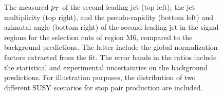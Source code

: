 \begin{figure}[!ht]
\begin{center}
{    }
  \end{center}
  \caption[Kinematic distributions of the $\pt$ of the second leading jet, the jet multiplicity, and the pseudo-rapidity and azimutal angle of the second leading jet in the signal regions for the selection cuts of region M6, after the normalization factors extracted from the fit have been applied.]
{The measured $\pt$ of the second leading jet (top left), the jet multiplicity (top right), and the pseudo-rapidity (bottom left) and azimutal angle (bottom right) of the second leading jet in the signal regions for the selection cuts of region M6, compared to the background predictions. The latter include the global normalization factors extracted from the fit. The error bands in the ratios include the statistical and experimental uncertainties on the background predictions. For illustration purposes, the distribution of two different SUSY scenarios for stop pair production are included.}
  \label{fig:Plot_M6_SR_Jet2}
\end{figure}

